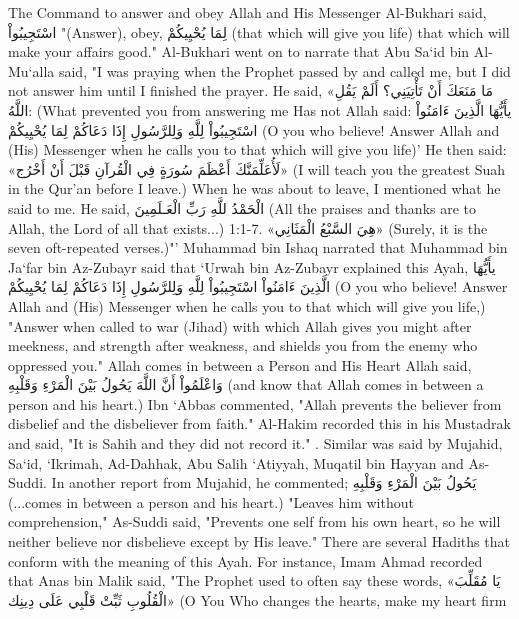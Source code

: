\documentclass[11pt,a4paper,openany]{book}
\let\textAR\textarabic
\begin{document}
\begin{tafsirbox}
The Command to answer and obey Allah and His Messenger Al-Bukhari said, \textAR{اسْتَجِيبُواْ} "(Answer), obey, \textAR{لِمَا} \textAR{يُحْيِيكُمْ} (that which will give you life) that which will make your affairs good." Al-Bukhari went on to narrate that Abu Sa`id bin Al-Mu`alla said, "I was praying when the Prophet passed by and called me, but I did not answer him until I finished the prayer. He said, \textAR{«مَا} \textAR{مَنَعَكَ} \textAR{أَنْ} \textAR{تَأْتِيَنِي؟} \textAR{أَلَمْ} \textAR{يَقُلِ} \textAR{اللَّهُ}: (What prevented you from answering me Has not Allah said: \textAR{يأَيُّهَا} \textAR{الَّذِينَ} \textAR{ءَامَنُواْ} \textAR{اسْتَجِيبُواْ} \textAR{لِلَّهِ} \textAR{وَلِلرَّسُولِ} \textAR{إِذَا} \textAR{دَعَاكُمْ} \textAR{لِمَا} \textAR{يُحْيِيكُمْ} (O you who believe! Answer Allah and (His) Messenger when he calls you to that which will give you life)' He then said: \textAR{«لَأُعَلِّمَنَّكَ} \textAR{أَعْظَمَ} \textAR{سُورَةٍ} \textAR{فِي} \textAR{الْقُرآنِ} \textAR{قَبْلَ} \textAR{أَنْ} \textAR{أَخْرُج»} (I will teach you the greatest Suah in the Qur'an before I leave.) When he was about to leave, I mentioned what he said to me. He said, \textAR{الْحَمْدُ} \textAR{للَّهِ} \textAR{رَبِّ} \textAR{الْعَـلَمِينَ} (All the praises and thanks are to Allah, the Lord of all that exists...) 1:1-7. \textAR{«هِيَ} \textAR{السَّبْعُ} \textAR{الْمَثَانِي»} (Surely, it is the seven oft-repeated verses.)"' Muhammad bin Ishaq narrated that Muhammad bin Ja`far bin Az-Zubayr said that `Urwah bin Az-Zubayr explained this Ayah, \textAR{يأَيُّهَا} \textAR{الَّذِينَ} \textAR{ءَامَنُواْ} \textAR{اسْتَجِيبُواْ} \textAR{لِلَّهِ} \textAR{وَلِلرَّسُولِ} \textAR{إِذَا} \textAR{دَعَاكُمْ} \textAR{لِمَا} \textAR{يُحْيِيكُمْ} (O you who believe! Answer Allah and (His) Messenger when he calls you to that which will give you life,) "Answer when called to war (Jihad) with which Allah gives you might after meekness, and strength after weakness, and shields you from the enemy who oppressed you." Allah comes in between a Person and His Heart Allah said, \textAR{وَاعْلَمُواْ} \textAR{أَنَّ} \textAR{اللَّهَ} \textAR{يَحُولُ} \textAR{بَيْنَ} \textAR{الْمَرْءِ} \textAR{وَقَلْبِهِ} (and know that Allah comes in between a person and his heart.) Ibn `Abbas commented, "Allah prevents the believer from disbelief and the disbeliever from faith." Al-Hakim recorded this in his Mustadrak and said, "It is Sahih and they did not record it." . Similar was said by Mujahid, Sa`id, `Ikrimah, Ad-Dahhak, Abu Salih `Atiyyah, Muqatil bin Hayyan and As-Suddi. In another report from Mujahid, he commented; \textAR{يَحُولُ} \textAR{بَيْنَ} \textAR{الْمَرْءِ} \textAR{وَقَلْبِهِ} (...comes in between a person and his heart.) "Leaves him without comprehension," As-Suddi said, "Prevents one self from his own heart, so he will neither believe nor disbelieve except by His leave." There are several Hadiths that conform with the meaning of this Ayah. For instance, Imam Ahmad recorded that Anas bin Malik said, "The Prophet used to often say these words, \textAR{«يَا} \textAR{مُقَلِّبَ} \textAR{الْقُلُوبِ} \textAR{ثَبِّتْ} \textAR{قَلْبِي} \textAR{عَلَى} \textAR{دِينِك»} (O You Who changes the hearts, make my heart firm 
\end{tafsirbox}
\end{document}
